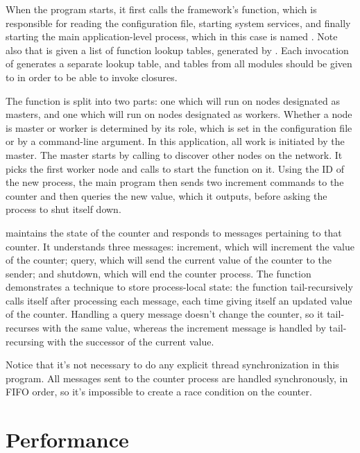 \documentclass[preprint]{sigplanconf}
\begin{document}
When the program starts, it first calls the framework's  function, which is responsible for reading the configuration file, starting system services, and finally starting the main application-level process, which in this case is named . Note also that  is given a list of function lookup tables, generated by . Each invocation of  generates a separate lookup table, and tables from all modules should be given to  in order to be able to invoke closures.

The  function is split into two parts: one which will run on nodes designated as masters, and one which will run on nodes designated as workers. Whether a node is master or worker is determined by its role, which is set in the configuration file or by a command-line argument. In this application, all work is initiated by the master. The master starts by calling  to discover other nodes on the network. It picks the first worker node and calls  to start the  function on it. Using the ID of the new process, the main program then sends two increment commands to the counter and then queries the new value, which it outputs, before asking the process to shut itself down.

 maintains the state of the counter and responds to messages pertaining to that counter. It understands three messages: increment, which will increment the value of the counter; query, which will send the current value of the counter to the sender; and shutdown, which will end the counter process. The  function demonstrates a technique to store process-local state: the function tail-recursively calls itself after processing each message, each time giving itself an updated value of the counter. Handling a query message doesn't change the counter, so it tail-recurses with the same value, whereas the increment message is handled by tail-recursing with the successor of the current value.

Notice that it's not necessary to do any explicit thread synchronization in this program. All messages sent to the counter process are handled synchronously, in FIFO order, so it's impossible to create a race condition on the counter.

\section{Performance}
\end{document}
